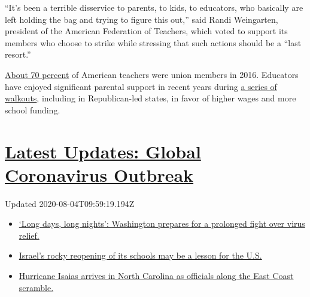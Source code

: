 ``It's been a terrible disservice to parents, to kids, to educators, who
basically are left holding the bag and trying to figure this out,'' said
Randi Weingarten, president of the American Federation of Teachers,
which voted to support its members who choose to strike while stressing
that such actions should be a ``last resort.''

\href{https://nces.ed.gov/surveys/ntps/tables/Table_TeachersUnion.asp}{About
70 percent} of American teachers were union members in 2016. Educators
have enjoyed significant parental support in recent years during
\href{https://www.nytimes3xbfgragh.onion/2019/01/14/us/lausd-teachers-strike.html}{a
series of walkouts}, including in Republican-led states, in favor of
higher wages and more school funding.

\hypertarget{latest-updates-global-coronavirus-outbreak}{%
\section{\texorpdfstring{\href{https://www.nytimes3xbfgragh.onion/2020/08/04/world/coronavirus-covid-19.html?action=click\&pgtype=Article\&state=default\&region=MAIN_CONTENT_1\&context=storylines_live_updates}{Latest
Updates: Global Coronavirus
Outbreak}}{Latest Updates: Global Coronavirus Outbreak}}\label{latest-updates-global-coronavirus-outbreak}}

Updated 2020-08-04T09:59:19.194Z

\begin{itemize}
\tightlist
\item
  \href{https://www.nytimes3xbfgragh.onion/2020/08/04/world/coronavirus-covid-19.html?action=click\&pgtype=Article\&state=default\&region=MAIN_CONTENT_1\&context=storylines_live_updates\#link-6b644638}{`Long
  days, long nights': Washington prepares for a prolonged fight over
  virus relief.}
\item
  \href{https://www.nytimes3xbfgragh.onion/2020/08/04/world/coronavirus-covid-19.html?action=click\&pgtype=Article\&state=default\&region=MAIN_CONTENT_1\&context=storylines_live_updates\#link-7af9fca0}{Israel's
  rocky reopening of its schools may be a lesson for the U.S.}
\item
  \href{https://www.nytimes3xbfgragh.onion/2020/08/04/world/coronavirus-covid-19.html?action=click\&pgtype=Article\&state=default\&region=MAIN_CONTENT_1\&context=storylines_live_updates\#link-33bf9168}{Hurricane
  Isaias arrives in North Carolina as officials along the East Coast
  scramble.}
\end{itemize}

